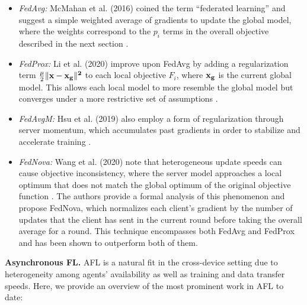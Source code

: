 \documentclass{article}
\begin{document}
\begin{itemize}[leftmargin=1em]
    \item \emph{FedAvg: }McMahan et al. (2016) coined the term ``federated learning'' and suggest a simple weighted average of gradients to update the global model, where the weights correspond to the $p_i$ terms in the overall objective described in the next section \cite{mcmahan2023communicationefficient}. 
    \item \emph{FedProx: }Li et al. (2020) improve upon FedAvg by adding a regularization term $\frac{\mu}{2}\|\bf{x} - \bf{x_g}\|^2$ to each local objective $F_i$, where $\bf{x_g}$ is the current global model. This allows each local model to more resemble the global model but converges under a more restrictive set of assumptions \cite{li2020federated}.
    \item \emph{FedAvgM: }Hsu et al. (2019) also employ a form of regularization through server momentum, which accumulates past gradients in order to stabilize and accelerate training \cite{hsu2019measuring}. 
    \item \emph{FedNova: }Wang et al. (2020) note that heterogeneous update speeds can cause objective inconsistency, where the server model approaches a local optimum that does not match the global optimum of the original objective function \cite{wang2020tackling}. The authors provide a formal analysis of this phenomenon and propose FedNova, which normalizes each client's gradient by the number of updates that the client has sent in the current round before taking the overall average for a round. This technique encompasses both FedAvg and FedProx and has been shown to outperform both of them.
\end{itemize}

{\bf Asynchronous FL.} AFL is a natural fit in the cross-device setting due to heterogeneity among agents' availability as well as training and data transfer speeds. Here, we provide an overview of the most prominent work in AFL to date:
\end{document}
